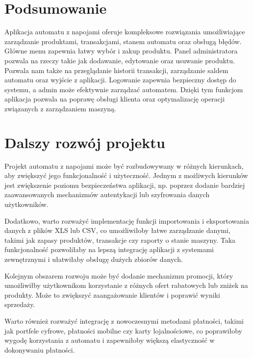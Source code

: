 \section{Podsumowanie}
Aplikacja automatu z napojami oferuje kompleksowe rozwiązania umożliwiające zarządzanie produktami, transakcjami, stanem automatu oraz obsługą błędów. Główne menu zapewnia łatwy wybór i zakup produktu. Panel administratora pozwala na rzeczy takie jak dodawanie, edytowanie oraz usuwanie produktu. Pozwala nam także na przeglądanie historii transakcji, zarządzanie saldem automatu oraz wyjście z aplikacji. Logowanie zapewnia bezpieczny dostęp do systemu, a admin może efektywnie zarządzać automatem. Dzięki tym funkcjom aplikacja pozwala na poprawę obsługi klienta oraz optymalizację operacji związanych z zarządzaniem maszyną.

\section{Dalszy rozwój projektu}

Projekt automatu z napojami może być rozbudowywany w różnych kierunkach, aby zwiększyć jego funkcjonalność i użyteczność. Jednym z możliwych kierunków jest zwiększenie poziomu bezpieczeństwa aplikacji, np. poprzez dodanie bardziej zaawansowanych mechanizmów autentykacji lub szyfrowania danych użytkowników.

Dodatkowo, warto rozważyć implementację funkcji importowania i eksportowania danych z plików XLS lub CSV, co umożliwiłoby łatwe zarządzanie danymi, takimi jak zapasy produktów, transakcje czy raporty o stanie maszyny. Taka funkcjonalność pozwoliłaby na lepszą integrację aplikacji z systemami zewnętrznymi i ułatwiłaby obsługę dużych zbiorów danych.

Kolejnym obszarem rozwoju może być dodanie mechanizmu promocji, który umożliwiłby użytkownikom korzystanie z różnych ofert rabatowych lub zniżek na produkty. Może to zwiększyć zaangażowanie klientów i poprawić wyniki sprzedaży.

Warto również rozważyć integrację z nowoczesnymi metodami płatności, takimi jak portfele cyfrowe, płatności mobilne czy karty lojalnościowe, co poprawiłoby wygodę korzystania z automatu i zapewniłoby większą elastyczność w dokonywaniu płatności.

